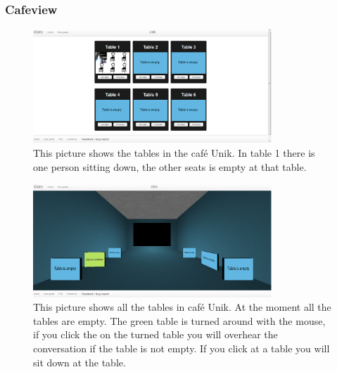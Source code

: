 \documentclass[12pt, titlepage]{article}
\begin{document}
\subsubsection{Cafeview}
\begin{figure}[H]
  \centering
	\includegraphics[width=0.8\textwidth,keepaspectratio]{thetables.png}
  \caption{This picture shows the tables in the café Unik. In table 1 there is one person sitting down, the other seats is empty at that table.}
\end{figure}
\begin{figure}[H]
  \centering
	\includegraphics[width=0.8\textwidth,keepaspectratio]{thetables3D.png}
  \caption{This picture shows all the tables in café Unik. At the moment all the tables are empty. The green table is turned around with the mouse, if you click the on the turned table you will overhear the conversation if the table is not empty. If you click at a table you will sit down at the table.}
\end{figure}
\end{document}
